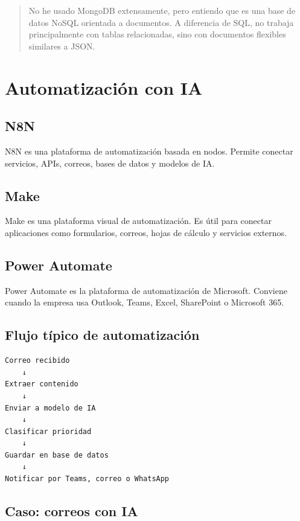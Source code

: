 \documentclass[12pt]{article}
\begin{document}
\begin{quote}
No he usado MongoDB extensamente, pero entiendo que es una base de datos NoSQL orientada a documentos. A diferencia de SQL, no trabaja principalmente con tablas relacionadas, sino con documentos flexibles similares a JSON.
\end{quote}

\section{Automatización con IA}

\subsection{N8N}

N8N es una plataforma de automatización basada en nodos. Permite conectar servicios, APIs, correos, bases de datos y modelos de IA.

\subsection{Make}

Make es una plataforma visual de automatización. Es útil para conectar aplicaciones como formularios, correos, hojas de cálculo y servicios externos.

\subsection{Power Automate}

Power Automate es la plataforma de automatización de Microsoft. Conviene cuando la empresa usa Outlook, Teams, Excel, SharePoint o Microsoft 365.

\subsection{Flujo típico de automatización}

\begin{lstlisting}
Correo recibido
    ↓
Extraer contenido
    ↓
Enviar a modelo de IA
    ↓
Clasificar prioridad
    ↓
Guardar en base de datos
    ↓
Notificar por Teams, correo o WhatsApp
\end{lstlisting}

\subsection{Caso: correos con IA}
\end{document}
